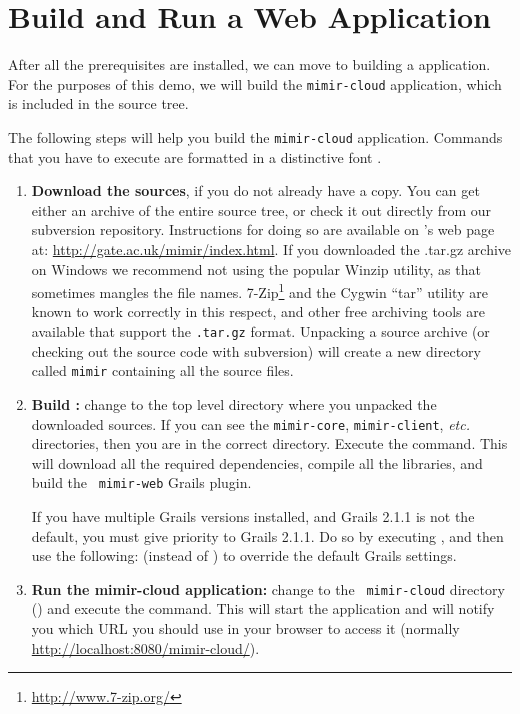 \section{Build and Run a \Mimir{} Web Application}
%
After all the prerequisites are installed, we can move to building a \Mimir{}
application. For the purposes of this demo, we will build the {\tt mimir-cloud}
application, which is included in the source tree.

The following steps will help you build the {\tt mimir-cloud} application.
Commands that you have to execute are formatted in a distinctive font
.
\begin{enumerate}
  \item {\bf Download the \Mimir{} sources}, if you do not already have a copy.
  You can get either an archive of the entire source tree, or check it out
  directly from our subversion repository. Instructions for doing so are
  available on \Mimir{}'s web page at:
  \url{http://gate.ac.uk/mimir/index.html}.
  If you downloaded the .tar.gz archive on Windows we recommend not using the
  popular Winzip utility, as that sometimes mangles the file names. 
  7-Zip\footnote{\url{http://www.7-zip.org/}} and the Cygwin ``tar'' utility are
  known to work correctly in this respect, and other free archiving tools are 
  available that support the {\tt .tar.gz} format.
  Unpacking a source archive (or checking out the source code with subversion)
  will create a new directory called {\tt mimir} containing all the source
  files.
  \item {\bf Build \Mimir{}:} change to the top level directory where you
  unpacked the downloaded \Mimir{} sources. If you can see the {\tt mimir-core},
  {\tt mimir-client}, {\em etc.} directories, then you are in the correct
  directory. Execute the  command. This will download all the
  required dependencies, compile all the \Mimir{} libraries, and build the {\tt
  mimir-web} Grails plugin.
  
  If you have multiple Grails versions installed, and Grails 2.1.1 is not the
  default, you must give priority to Grails 2.1.1.  Do so by executing
  , and then use the following:
   (instead of ) to
  override the default Grails settings.
  \item {\bf Run the mimir-cloud application:}  change to the {\tt
  mimir-cloud} directory () and execute the  command. This will start the application and will notify you which
  URL you should use in your browser to access it (normally
  \url{http://localhost:8080/mimir-cloud/}).
\end{enumerate}
%
